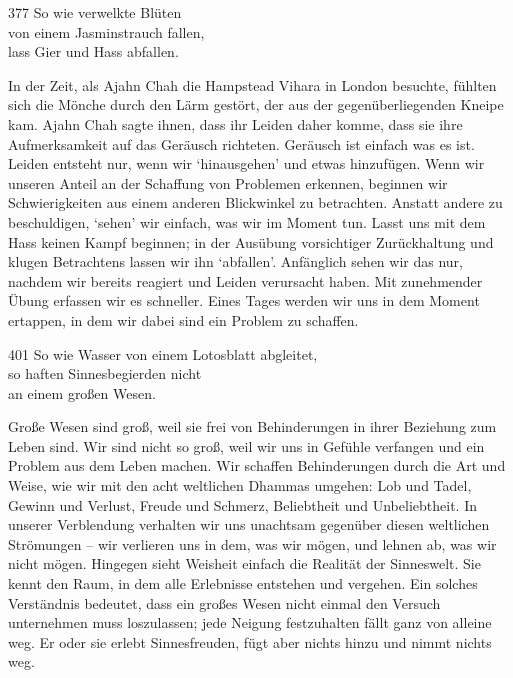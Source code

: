 
\begin{dhpVerse}{377}
\label{dhp-377}
So wie verwelkte Blüten\\ 
von einem Jasminstrauch fallen,\\ 
lass Gier und Hass abfallen. 
\end{dhpVerse}

\begin{dhpRefl}

In der Zeit, als Ajahn Chah die Hampstead Vihara in London besuchte, fühlten
sich die Mönche durch den Lärm gestört, der aus der gegenüberliegenden Kneipe
kam. Ajahn Chah sagte ihnen, dass ihr Leiden daher komme, dass sie ihre
Aufmerksamkeit auf das Geräusch richteten. Geräusch ist einfach was es ist.
Leiden entsteht nur, wenn wir `hinausgehen' und etwas hinzufügen. Wenn wir
unseren Anteil an der Schaffung von Problemen erkennen, beginnen wir
Schwierigkeiten aus einem anderen Blickwinkel zu betrachten. Anstatt andere zu
beschuldigen, `sehen' wir einfach, was wir im Moment tun. Lasst uns mit dem
Hass keinen Kampf beginnen; in der Ausübung vorsichtiger Zurückhaltung und
klugen Betrachtens lassen wir ihn `abfallen'. Anfänglich sehen wir das nur,
nachdem wir bereits reagiert und Leiden verursacht haben. Mit zunehmender
Übung erfassen wir es schneller. Eines Tages werden wir uns in dem Moment
ertappen, in dem wir dabei sind ein Problem zu schaffen.

\end{dhpRefl}


\begin{dhpVerse}{401}
\label{dhp-401}
So wie Wasser von einem Lotosblatt abgleitet,\\ 
so haften Sinnesbegierden nicht\\ 
an einem großen Wesen. 
\end{dhpVerse}

\begin{dhpRefl}

Große Wesen sind groß, weil sie frei von Behinderungen in ihrer Beziehung zum
Leben sind. Wir sind nicht so groß, weil wir uns in Gefühle verfangen und ein
Problem aus dem Leben machen. Wir schaffen Behinderungen durch die Art und
Weise, wie wir mit den acht weltlichen Dhammas umgehen: Lob und Tadel, Gewinn
und Verlust, Freude und Schmerz, Beliebtheit und Unbeliebtheit. In unserer
Verblendung verhalten wir uns unachtsam gegenüber diesen weltlichen Strömungen
-- wir verlieren uns in dem, was wir mögen, und lehnen ab, was wir nicht
mögen. Hingegen sieht Weisheit einfach die Realität der Sinneswelt. Sie kennt
den Raum, in dem alle Erlebnisse entstehen und vergehen. Ein solches
Verständnis bedeutet, dass ein großes Wesen nicht einmal den Versuch
unternehmen muss loszulassen; jede Neigung festzuhalten fällt ganz von alleine
weg. Er oder sie erlebt Sinnesfreuden, fügt aber nichts hinzu und nimmt nichts
weg.

\end{dhpRefl}

